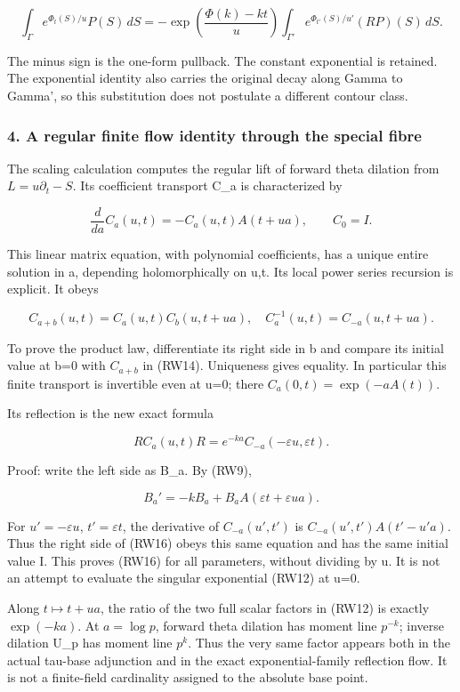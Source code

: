 \[
\int_\Gamma e^{\Phi_t(S)/u}P(S)\,dS
=-\exp\!\left(\frac{\Phi(k)-kt}{u}\right)
\int_{\Gamma'} e^{\Phi_{t'}(S)/u'}(RP)(S)\,dS.
\tag{RW13}
\]

The minus sign is the one-form pullback. The constant exponential is retained. The exponential identity also carries the original decay along Gamma to Gamma', so this substitution does not postulate a different contour class.

\subsubsection{4. A regular finite flow identity through the special fibre}\label{endpoint-f1_reflection--a-regular-finite-flow-identity-through-the-special-fibre}

The scaling calculation computes the regular lift of forward theta dilation from \(L=u\partial_t-S\). Its coefficient transport C\_a is characterized by

\[
\frac{d}{da}C_a(u,t)=-C_a(u,t)A(t+ua),\qquad C_0=I.
\tag{RW14}
\]

This linear matrix equation, with polynomial coefficients, has a unique entire solution in a, depending holomorphically on u,t. Its local power series recursion is explicit. It obeys

\[
C_{a+b}(u,t)=C_a(u,t)C_b(u,t+ua),
\quad C_a^{-1}(u,t)=C_{-a}(u,t+ua).
\tag{RW15}
\]

To prove the product law, differentiate its right side in b and compare its initial value at b=0 with \(C_{a+b}\) in (RW14). Uniqueness gives equality. In particular this finite transport is invertible even at u=0; there \(C_a(0,t)=\exp(-aA(t))\).

Its reflection is the new exact formula

\[
\boxed{R C_a(u,t)R=e^{-ka}C_{-a}(-\varepsilon u,\varepsilon t).}
\tag{RW16}
\]

Proof: write the left side as B\_a. By (RW9),

\[
B_a'=-kB_a+B_aA(\varepsilon t+\varepsilon ua).
\]

For \(u'=-\varepsilon u\), \(t'=\varepsilon t\), the derivative of \(C_{-a}(u',t')\) is \(C_{-a}(u',t')A(t'-u' a)\). Thus the right side of (RW16) obeys this same equation and has the same initial value I. This proves (RW16) for all parameters, without dividing by u. It is not an attempt to evaluate the singular exponential (RW12) at u=0.

Along \(t\mapsto t+ua\), the ratio of the two full scalar factors in (RW12) is exactly \(\exp(-ka)\). At \(a=\log p\), forward theta dilation has moment line \(p^{-k}\); inverse dilation U\_p has moment line \(p^k\). Thus the very same factor appears both in the actual tau-base adjunction and in the exact exponential-family reflection flow. It is not a finite-field cardinality assigned to the absolute base point.

